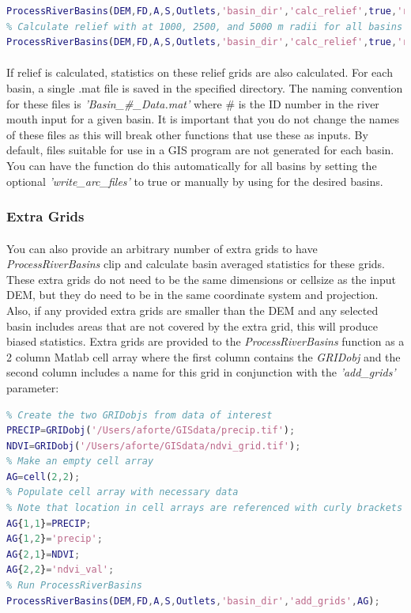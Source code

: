 \begin{lstlisting}[language=Matlab]
% Calculate relief with a radius of 2500 m for all basins
ProcessRiverBasins(DEM,FD,A,S,Outlets,'basin_dir','calc_relief',true,'relief_radii',2500);
% Calculate relief with at 1000, 2500, and 5000 m radii for all basins
ProcessRiverBasins(DEM,FD,A,S,Outlets,'basin_dir','calc_relief',true,'relief_radii',[1000 2500 5000]);
\end{lstlisting}

\paragraph{}If relief is calculated, statistics on these relief grids are also calculated. For each basin, a single .mat file is saved in the specified directory. The naming convention for these files is \textit{'Basin\_\#\_Data.mat'} where \# is the ID number in the river mouth input for a given basin. It is important that you do not change the names of these files as this will break other functions that use these as inputs. By default, files suitable for use in a GIS program are not generated for each basin. You can have the function do this automatically for all basins by setting the optional \textit{'write\_arc\_files'} to true or manually by using  for the desired basins.

\subsubsection{Extra Grids}
\paragraph{}You can also provide an arbitrary number of extra grids to have \textit{ProcessRiverBasins} clip and calculate basin averaged statistics for these grids. These extra grids do not need to be the same dimensions or cellsize as the input DEM, but they do need to be in the same coordinate system and projection. Also, if any provided extra grids are smaller than the DEM and any selected basin includes areas that are not covered by the extra grid, this will produce biased statistics. Extra grids are provided to the \textit{ProcessRiverBasins} function as a 2 column Matlab cell array where the first column contains the \textit{GRIDobj} and the second column includes a name for this grid in conjunction with the \textit{'add\_grids'} parameter:

\begin{lstlisting}[language=Matlab]
% To run ProcessRiverBasins and include two extra grids
% Create the two GRIDobjs from data of interest
PRECIP=GRIDobj('/Users/aforte/GISdata/precip.tif');
NDVI=GRIDobj('/Users/aforte/GISdata/ndvi_grid.tif');
% Make an empty cell array
AG=cell(2,2);
% Populate cell array with necessary data 
% Note that location in cell arrays are referenced with curly brackets
AG{1,1}=PRECIP;
AG{1,2}='precip';
AG{2,1}=NDVI;
AG{2,2}='ndvi_val';
% Run ProcessRiverBasins
ProcessRiverBasins(DEM,FD,A,S,Outlets,'basin_dir','add_grids',AG);
\end{lstlisting}

